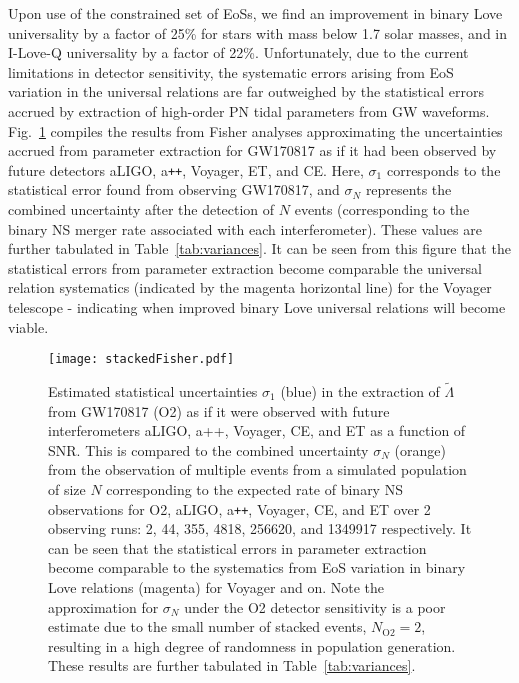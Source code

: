 \documentclass[prd,twocolumn,nofootinbib,superscriptaddress,amsmath,amssymb]{revtex4-1}
\begin{document}
Upon use of the constrained set of EoSs, we find an improvement in binary Love universality by a factor of 25\% for stars with mass below 1.7 solar masses, and in I-Love-Q universality by a factor of 22\%.
Unfortunately, due to the current limitations in detector sensitivity, the systematic errors arising from EoS variation in the universal relations are far outweighed by the statistical errors accrued by extraction of high-order PN tidal parameters from GW waveforms.
Fig.~\ref{fig:stackedFisher} compiles the results from Fisher analyses approximating the uncertainties accrued from parameter extraction for GW170817 as if it had been observed by future detectors aLIGO, a\texttt{++}, Voyager, ET, and CE.
Here, $\sigma_1$ corresponds to the statistical error found from observing GW170817, and $\sigma_N$ represents the combined uncertainty after the detection of $N$ events (corresponding to the binary NS merger rate associated with each interferometer).
These values are further tabulated in Table~\ref{tab:variances}.
It can be seen from this figure that the statistical errors from parameter extraction become comparable the universal relation systematics (indicated by the magenta horizontal line) for the Voyager telescope - indicating when improved binary Love universal relations will become viable.
\begin{figure}
\begin{center} 
\texttt{[image: stackedFisher.pdf]}
\end{center}
\caption{
Estimated statistical uncertainties $\sigma_1$ (blue) in the extraction of $\tilde{\Lambda}$ from GW170817 (O2) as if it were observed with future interferometers aLIGO, a++, Voyager, CE, and ET as a function of SNR.
This is compared to the combined uncertainty $\sigma_N$ (orange) from the observation of multiple events from a simulated population of size $N$ corresponding to the expected rate of binary NS observations for O2, aLIGO, a\texttt{++}, Voyager, CE, and ET over 2 observing runs: 2, 44, 355, 4818, 256620, and 1349917 respectively.
It can be seen that the statistical errors in parameter extraction become comparable to the systematics from EoS variation in binary Love relations (magenta) for Voyager and on.
Note the approximation for $\sigma_N$ under the O2 detector sensitivity is a poor estimate due to the small number of stacked events, $N_{\text{O2}}=2$, resulting in a high degree of randomness in population generation.
These results are further tabulated in Table~\ref{tab:variances}.
}
\label{fig:stackedFisher}
\end{figure} 
\end{document}
